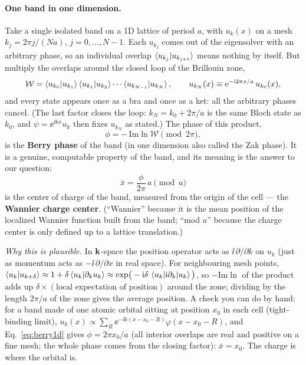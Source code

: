 \paragraph{One band in one dimension.} Take a single isolated band on a 1D
lattice of period $a$, with $u_k(x)$ on a mesh $k_j = 2\pi j/(N a)$,
$j = 0,\dots,N{-}1$. Each $u_{k_j}$ comes out of the eigensolver with an
arbitrary phase, so an individual overlap $\braket{u_{k_j}|u_{k_{j+1}}}$
means nothing by itself. But multiply the overlaps around the closed loop
of the Brillouin zone,
\begin{equation}
\mathcal W = \braket{u_{k_0}|u_{k_1}}\braket{u_{k_1}|u_{k_2}}\cdots
\braket{u_{k_{N-1}}|u_{k_N}},
\qquad u_{k_N}(x) \equiv \mathrm{e}^{-\mathrm{i} 2\pi x/a}\,u_{k_0}(x),
\label{eq:berry1d}
\end{equation}
and every state appears once as a bra and once as a ket: all the arbitrary
phases cancel. (The last factor closes the loop: $k_N = k_0 + 2\pi/a$ is
the same Bloch state as $k_0$, and $\psi = \ee^{\ii kx}u_k$ then fixes
$u_{k_N}$ as stated.) The phase of this product,
\begin{equation}
\phi = -\,\mathrm{Im}\ln \mathcal W \pmod{2\pi},
\end{equation}
is the \textbf{Berry phase} of the band (in one dimension also called the
Zak phase). It is a genuine, computable property of the band, and its
meaning is the answer to our question:
\begin{equation}
\boxed{\;\bar x = \frac{\phi}{2\pi}\,a \pmod a\;}
\label{eq:wcc}
\end{equation}
is the center of charge of the band, measured from the origin of the cell
--- the \textbf{Wannier charge center}. (``Wannier'' because it is the
mean position of the localized Wannier function built from the band;
``mod $a$'' because the charge center is only defined up to a lattice
translation.)

\emph{Why this is plausible.} In $\mathbf{k}$-space the position operator acts as
$\ii\,\partial/\partial k$ on $u_k$ (just as momentum acts as
$-\ii\,\partial/\partial x$ in real space). For neighbouring mesh points,
$\braket{u_k|u_{k+\delta}} \approx 1 + \delta\braket{u_k|\partial_k u_k}
\approx \exp\!\big(-\mathrm{i}\delta\, \braket{u_k|\mathrm{i}\partial_k|u_k}\big)$, so
$-\mathrm{Im}\ln$ of the product adds up
$\delta \times(\text{local expectation of position})$ around the zone;
dividing by the length $2\pi/a$ of the zone gives the average
position. A check you can do by hand: for a band made of one atomic
orbital sitting at position $x_0$ in each cell (tight-binding limit),
$u_k(x) \propto \sum_R \ee^{-\ii k(x - x_0 - R)}\varphi(x-x_0-R)$, and
Eq.~\eqref{eq:berry1d} gives $\phi = 2\pi x_0/a$ (all interior overlaps
are real and positive on a fine mesh; the whole phase comes from the
closing factor): $\bar x = x_0$. The charge is where the orbital is.

